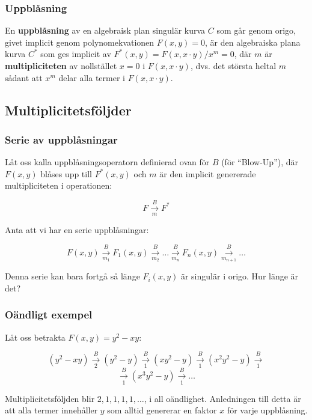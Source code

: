 \documentclass{beamer}
\begin{document}
\begin{frame}
	\frametitle{Uppblåsning}
\begin{Definition}
	En \textbf{uppblåsning} av en algebraisk plan singulär kurva $C$ som går genom origo, givet implicit genom polynomekvationen $F(x,y)=0$, är den algebraiska plana kurva $C^*$ som ges implicit av $F^*(x,y) = F(x,x\cdot y)/x^m=0$, där $m$ är \textbf{multipliciteten} av nollstället $x=0$ i $F(x,x\cdot y)$, dvs. det största heltal $m$ sådant att $x^m$ delar alla termer i $F(x,x\cdot y)$.
\end{Definition}
\end{frame}

\subsection{Multiplicitetsföljder}

\begin{frame}
	\frametitle{Serie av uppblåsningar}
Låt oss kalla uppblåsningsoperatorn definierad ovan för $B$ (för ``Blow-Up''), där $F(x,y)$ blåses upp till $F^*(x,y)$ och $m$ är den implicit genererade multipliciteten i operationen:

\[F \overset{B}{\underset{m}{\longrightarrow}} F^*\]

Anta att vi har en serie uppblåsningar:

\[
F(x,y) \overset{B}{\underset{m_1}{\longrightarrow}} F_1(x,y) \overset{B}{\underset{m_2}{\longrightarrow}} \ldots \overset{B}{\underset{m_n}{\longrightarrow}} F_n(x,y) \overset{B}{\underset{m_{n+1}}{\longrightarrow}} \ldots
\]

Denna serie kan bara fortgå så länge $F_i(x,y)$ är singulär i origo. Hur länge är det? 
\end{frame}

\begin{frame}
	\frametitle{Oändligt exempel}
	\begin{example}
		Låt oss betrakta $F(x,y)=y^2-xy$:
		
		\[
		(y^2-xy) \overset{B}{\underset{2}{\longrightarrow}} (y^2-y) \overset{B}{\underset{1}{\longrightarrow}} (xy^2-y) \overset{B}{\underset{1}{\longrightarrow}} (x^2y^2-y) 		
		\overset{B}{\underset{1}{\longrightarrow}}\]
		\[\overset{B}{\underset{1}{\longrightarrow}} (x^3y^2-y) \overset{B}{\underset{1}{\longrightarrow}} \ldots\]
		
		Multiplicitetsföljden blir $2,1,1,1,1,\ldots$, i all oändlighet. Anledningen till detta är att alla termer innehåller $y$ som alltid genererar en faktor $x$ för varje uppblåsning.
	\end{example}
\end{frame}
\end{document}
